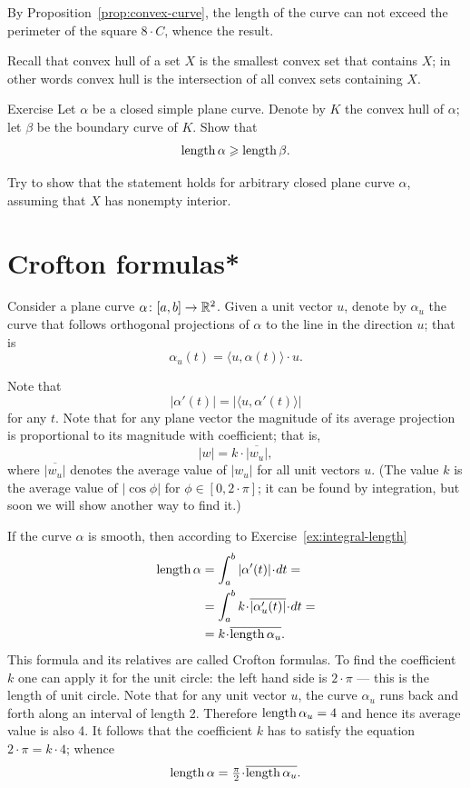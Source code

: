 By Proposition~\ref{prop:convex-curve}, the length of the curve can not exceed the perimeter of the square $8\cdot C$, whence the result.
\qeds

Recall that convex hull of a set $X$ is the smallest convex set that contains $X$; in other words convex hull is the intersection of all convex sets containing $X$.

\begin{thm}{Exercise}\label{ex:convex-hull}
Let $\alpha$ be a closed simple plane curve.
Denote by $K$ the convex hull of $\alpha$; let $\beta$ be the boundary curve of $K$.
Show that 
\[\mathop{\rm length}\nolimits \alpha\geqslant \mathop{\rm length}\nolimits \beta.\]

Try to show that the statement holds for arbitrary closed plane curve $\alpha$, assuming that $X$ has nonempty interior.
\end{thm}


\section*{Crofton formulas*}

Consider a plane curve $\alpha\colon[a,b]\to\mathbb{R}^2$.
Given a unit vector $u$, denote by $\alpha_u$ the curve that follows orthogonal projections of $\alpha$ to the line in the direction $u$;
that is 
\[\alpha_u(t)=\langle u,\alpha(t)\rangle\cdot u.\]

Note that 
\[|\alpha'(t)|=|\langle u,\alpha'(t)\rangle|\] for any $t$.
Note that for any plane vector the magnitude of its average projection is proportional to its magnitude with coefficient; that is,
\[|w|=k\cdot \overline{|w_u|},\]
where $\overline{|w_u|}$ denotes the average value of $|w_u|$ for all unit vectors $u$.
(The value $k$ is the average value of $|\cos\phi|$ for $\phi\in [0,2\cdot\pi]$; it can be found by integration, but soon we will show another way to find it.)

If the curve $\alpha$ is smooth, then according to Exercise~\ref{ex:integral-length}
\begin{align*}
\length\alpha
&=\int_a^b|\alpha'(t)|\cdot dt=
\\
&=\int_a^b  k\cdot \overline{|\alpha_u'(t)|}\cdot dt=
\\
&=k\cdot \overline{\length\alpha_u}.
\end{align*}
This formula and its relatives are called Crofton formulas.
To find the coefficient $k$ one can apply it for the unit circle: the left hand side is $2\cdot\pi$ --- this is the length of unit circle.
Note that for any unit vector $u$, the curve $\alpha_u$ runs back and forth along an interval of length 2.
Therefore $\mathop{\rm length}\nolimits\alpha_u=4$ and hence its average value is also 4.
It follows that the coefficient $k$ has to satisfy the equation $2\cdot \pi =k\cdot 4$; whence 
\[
\length\alpha
=\tfrac\pi2\cdot \overline{\length\alpha_u}.
\]

